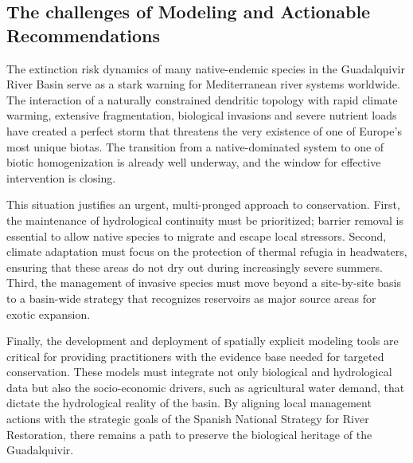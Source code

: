 \documentclass[11pt,a4paper]{article}
\begin{document}
\subsection{The challenges of Modeling and Actionable Recommendations}
The extinction risk dynamics of many native-endemic species in the Guadalquivir River Basin serve as a stark warning for Mediterranean river systems worldwide. The interaction of a naturally constrained dendritic topology with rapid climate warming, extensive fragmentation, biological invasions and severe nutrient loads have created a perfect storm that threatens the very existence of one of Europe’s most unique biotas. The transition from a native-dominated system to one of biotic homogenization is already well underway, and the window for effective intervention is closing.

This situation justifies an urgent, multi-pronged approach to conservation. First, the maintenance of hydrological continuity must be prioritized; barrier removal is essential to allow native species to migrate and escape local stressors. Second, climate adaptation must focus on the protection of thermal refugia in headwaters, ensuring that these areas do not dry out during increasingly severe summers. Third, the management of invasive species must move beyond a site-by-site basis to a basin-wide strategy that recognizes reservoirs as major source areas for exotic expansion.

Finally, the development and deployment of spatially explicit modeling tools are critical for providing practitioners with the evidence base needed for targeted conservation. These models must integrate not only biological and hydrological data but also the socio-economic drivers, such as agricultural water demand, that dictate the hydrological reality of the basin. By aligning local management actions with the strategic goals of the Spanish National Strategy for River Restoration, there remains a path to preserve the biological heritage of the Guadalquivir.
\end{document}
